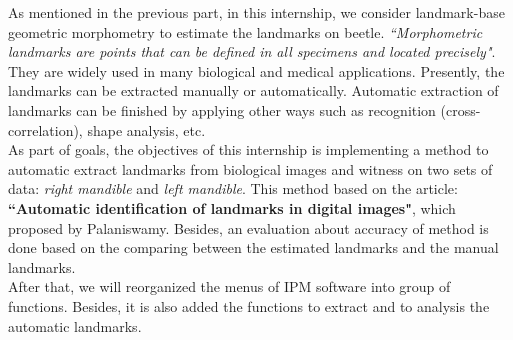 As mentioned in the previous part, in this internship, we consider landmark-base geometric morphometry to estimate the landmarks on beetle. \textit{``Morphometric landmarks are points that can be defined in all specimens  and located precisely"}\cite{palaniswamy2010automatic}. They are widely used in many biological and medical applications. Presently, the landmarks can be extracted manually or automatically. Automatic extraction of landmarks can be finished by applying other ways such as recognition (cross-correlation), shape analysis, etc.\\[0.2cm]
As part of goals, the objectives of this internship is implementing a method to automatic extract landmarks from biological images and witness on two sets of data: \textit{right mandible} and \textit{left mandible}. This method based on the article: \textbf{``Automatic identification of landmarks in digital images"}, which proposed by Palaniswamy\cite{palaniswamy2010automatic}. Besides, an evaluation about accuracy of method is done based on the comparing between the estimated landmarks and the manual landmarks.\\
After that, we will reorganized the menus of IPM software into group of functions. Besides, it is also added the functions to extract and to analysis the automatic landmarks.
